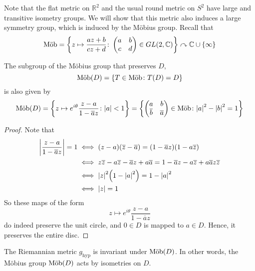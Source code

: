 Note that the flat metric on \( \mathbb R^2 \) and the usual round metric on \( S^2 \) have large and transitive isometry groups.
We will show that this metric also induces a large symmetry group, which is induced by the M\"obius group.
Recall that
\[
	\text{M\"ob} = \qty{z \mapsto \frac{az+b}{cz+d} \colon \begin{pmatrix}
			a & b \\
			c & d
		\end{pmatrix} \in GL(2,\mathbb C)} \curvearrowright \mathbb C \cup \qty{\infty}
\]
\begin{lemma}
	The subgroup of the M\"obius group that preserves \( D \),
	\[
		\text{M\"ob}(D) = \qty{T \in \text{M\"ob}\colon T(D) = D}
	\]
	is also given by
	\[
		\text{M\"ob}(D) = \qty{z \mapsto e^{i\theta} \frac{z-a}{1-\overline a z} \colon \abs{a} < 1} = \qty{\begin{pmatrix}
				a           & b           \\
				\overline b & \overline a
			\end{pmatrix} \in \text{M\"ob}\colon \abs{a}^2 - \abs{b}^2 = 1}
	\]
\end{lemma}
\begin{proof}
	Note that
	\begin{align*}
		\abs{\frac{z-a}{1-\overline a z}} = 1 & \iff (z-a)(\overline z - \overline a) = (1 - \overline a z)(1 - a \overline z)                                                     \\
		                                      & \iff z\overline z - a\overline z - \overline a z + a \overline a = 1 - \overline a z - a \overline z + a \overline a z \overline z \\
		                                      & \iff \abs{z}^2\qty(1 - \abs{a}^2) = 1 - \abs{a}^2                                                                                  \\
		                                      & \iff \abs{z} = 1
	\end{align*}
	So these maps of the form
	\[
		z \mapsto e^{i\theta} \frac{z-a}{1-\overline a z}
	\]
	do indeed preserve the unit circle, and \( 0 \in D \) is mapped to \( a \in D \).
	Hence, it preserves the entire disc.
\end{proof}
\begin{lemma}
	The Riemannian metric \( g_{\text{hyp}} \) is invariant under \( \text{M\"ob}(D) \).
	In other words, the M\"obius group \( \text{M\"ob}(D) \) acts by isometries on \( D \).
\end{lemma}
